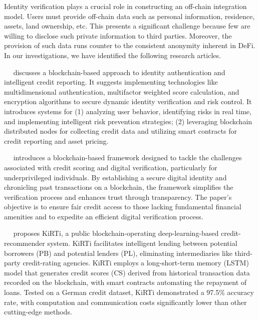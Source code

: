 \documentclass[../ICIT-Paper-2024.tex]{subfiles}
\begin{document}
Identity verification plays a crucial role in constructing an off-chain integration model. Users must provide off-chain data such as personal information, residence, assets, land ownership, etc. This presents a significant challenge because few are willing to disclose such private information to third parties. Moreover, the provision of such data runs counter to the consistent anonymity inherent in DeFi. In our investigations, we have identified the following research articles.

~\citeauthor{zhu2020blockchain}~\cite{zhu2020blockchain} discusses a blockchain-based approach to identity authentication and intelligent credit reporting. It suggests implementing technologies like multidimensional authentication, multifactor weighted score calculation, and encryption algorithms to secure dynamic identity verification and risk control. It introduces systems for (1) analyzing user behavior, identifying risks in real time, and implementing intelligent risk prevention strategies; (2) leveraging blockchain distributed nodes for collecting credit data and utilizing smart contracts for credit reporting and asset pricing.

~\citeauthor{jain2019blockchain}~\cite{jain2019blockchain} introduces a blockchain-based framework designed to tackle the challenges associated with credit scoring and digital verification, particularly for underprivileged individuals. By establishing a secure digital identity and chronicling past transactions on a blockchain, the framework simplifies the verification process and enhances trust through transparency. The paper's objective is to ensure fair credit access to those lacking fundamental financial amenities and to expedite an efficient digital verification process.

~\citeauthor{patel2020kirti}~\cite{patel2020kirti} proposes KiRTi, a public blockchain-operating deep-learning-based credit-recommender system. KiRTi facilitates intelligent lending between potential borrowers (PB) and potential lenders (PL), eliminating intermediaries like third-party credit-rating agencies. KiRTi employs a long-short-term memory (LSTM) model that generates credit scores (CS) derived from historical transaction data recorded on the blockchain, with smart contracts automating the repayment of loans. Tested on a German credit dataset, KiRTi demonstrated a 97.5\% accuracy rate, with computation and communication costs significantly lower than other cutting-edge methods.
\end{document}
